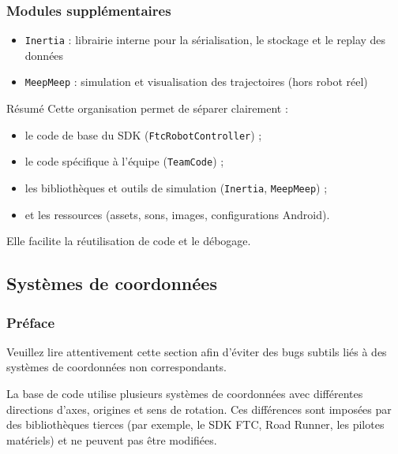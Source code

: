 \documentclass[12pt, a4paper]{report}
\begin{document}
    \subsubsection*{Modules supplémentaires}
    \begin{itemize}
        \item \texttt{Inertia} : librairie interne pour la sérialisation, le stockage et le replay des données
        \item \texttt{MeepMeep} : simulation et visualisation des trajectoires (hors robot réel)
    \end{itemize}

    \begin{myinfo}{Résumé}
        Cette organisation permet de séparer clairement :
        \begin{itemize}
            \item le code de base du SDK (\texttt{FtcRobotController}) ;
            \item le code spécifique à l’équipe (\texttt{TeamCode}) ;
            \item les bibliothèques et outils de simulation (\texttt{Inertia}, \texttt{MeepMeep}) ;
            \item et les ressources (assets, sons, images, configurations Android).
        \end{itemize}
        Elle facilite la réutilisation de code et le débogage.
    \end{myinfo}

    \subsection{Systèmes de coordonnées}


    \subsubsection*{Préface}

    Veuillez lire attentivement cette section afin d'éviter des bugs subtils liés à des systèmes de coordonnées non correspondants.

    La base de code utilise plusieurs systèmes de coordonnées avec différentes directions d'axes,
    origines et sens de rotation. Ces différences sont imposées par des bibliothèques tierces
    (par exemple, le SDK FTC, Road Runner, les pilotes matériels) et ne peuvent pas être modifiées.
\end{document}
